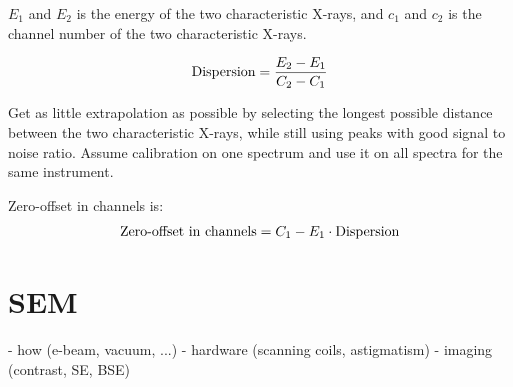 
$E_1$ and $E_2$ is the energy of the two characteristic X-rays, and $c_1$ and $c_2$ is the channel number of the two characteristic X-rays.

\begin{equation}
    \label{eq:theory:calibration:dispersion}
    \textnormal{Dispersion} = \frac{E_2 - E_1}{C_2 - C_1}
\end{equation}

Get as little extrapolation as possible by selecting the longest possible distance between the two characteristic X-rays, while still using peaks with good signal to noise ratio.
Assume calibration on one spectrum and use it on all spectra for the same instrument.


Zero-offset in channels is:
\begin{equation}
    \label{eq:theory:calibration:offset}
    \textnormal{Zero-offset in channels} = C_1 - E_1 \cdot \textnormal{Dispersion}
\end{equation}



\section{SEM}
\label{sec:theory:sem}


- how (e-beam, vacuum, ...)
- hardware (scanning coils, astigmatism)
- imaging (contrast, SE, BSE)






